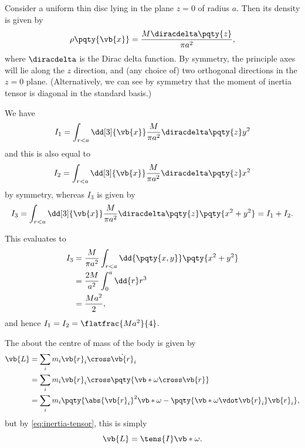\begin{example}
    Consider a uniform thin disc lying in the plane \(z = 0\) of radius \(a\). Then its density is given by
    \begin{equation}
        \rho\pqty{\vb{x}} = \frac{M \diracdelta\pqty{z}}{\pi a^2},
    \end{equation}
    where \(\diracdelta\) is the Dirac delta function. By symmetry, the principle axes will lie along the \(z\) direction, and (any choice of) two orthogonal directions in the \(z = 0\) plane. (Alternatively, we can see by symmetry that the moment of inertia tensor is diagonal in the standard basis.)

    We have
    \begin{equation}
        I_1 = \int_{r < a} \dd[3]{\vb{x}} \frac{M}{\pi a^2} \diracdelta\pqty{z} y^2
    \end{equation}
    and this is also equal to
    \begin{equation}
        I_2 = \int_{r < a} \dd[3]{\vb{x}} \frac{M}{\pi a^2} \diracdelta\pqty{z} x^2
    \end{equation}
    by symmetry, whereas \(I_3\) is given by
    \begin{equation}
        I_3 = \int_{r < a} \dd[3]{\vb{x}} \frac{M}{\pi a^2} \diracdelta\pqty{z} \pqty{x^2 + y^2} = I_1 + I_2.
    \end{equation}

    This evaluates to
    \begin{subequations}
        \begin{align}
            I_3 &= \frac{M}{\pi a^2} \int_{r < a} \dd{\pqty{x, y}} \pqty{x^2 + y^2} \\
            &= \frac{2M}{a^2} \int_{0}^{a} \dd{r} r^3 \\
            &= \frac{M a^2}{2},
        \end{align}
    \end{subequations}
    and hence \(I_1 = I_2 = \flatfrac{M a^2}{4}\).
\end{example}

The  about the centre of mass of the body is given by
\begin{subequations}
    \begin{align}
        \vb{L} &= \sum_{i} m_i \vb{r}_i \cross \dot{\vb{r}}_i \\
        &= \sum_{i} m_i \vb{r}_i \cross \pqty{\vb*{\omega} \cross \vb{r}} \\
        &= \sum_{i} m_i \pqty{\abs{\vb{r}_i}^2 \vb*{\omega} - \pqty{\vb*{\omega} \vdot \vb{r}_i} \vb{r}_i},
    \end{align}
\end{subequations}
but by \eqref{eq:inertia-tensor}, this is simply
\begin{equation}
    \vb{L} = \tens{I} \vb*{\omega}.
\end{equation}

